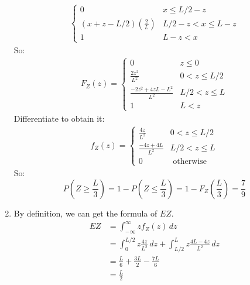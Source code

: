 \documentclass[hidelinks]{article}
\begin{document}
\begin{enumerate}
\begin{align*}
        \begin{cases}
            0 & x \leq L/2 -z \\
            (x+z - L/2)(\frac{2}{L}) & L/2 -z < x \leq L - z\\
            1 & L - z< x
        \end{cases}
    \end{align*}
    So:
    \begin{align*}
        F_Z(z) = 
        \begin{cases}
        0    &   z \leq 0 \\
        \frac{2z^2}{L^2}    & 0 < z \leq L/2 \\
        \frac{-2z^2+ 4zL - L^2}{L^2}    &   L/2 < z \leq L \\
        1    & L < z
        \end{cases}
    \end{align*}
    Differentiate to obtain it:
    \begin{align*}
        f_Z(z) = 
        \begin{cases}
            \frac{4z}{L^2}    & 0 < z \leq L/2 \\
            \frac{-4z + 4L}{L^2}    &   L/2 < z \leq L \\
            0 & \text{ otherwise }
        \end{cases}
    \end{align*}
    So:
    \begin{equation*}
        P(Z \geq \frac{L}{3}) = 1 - P(Z \leq \frac{L}{3}) = 1 - F_Z(\frac{L}{3}) = \frac{7}{9}
    \end{equation*}

    \item By definition, we can get the formula of $EZ$.
    \begin{align*}
        EZ  &= \int^\infty_{-\infty} zf_Z(z) \, dz \\
            &= \int^{L/2}_{0} z\frac{4z}{L^2} \, dz + \int^{L}_{L/2} z\frac{4L - 4z}{L^2} \, dz\\
            &= \frac{L}{6} + \frac{3L}{2}- \frac{7L}{6} \\
            &= \frac{L}{2}
    \end{align*}
\end{enumerate}
\end{document}
